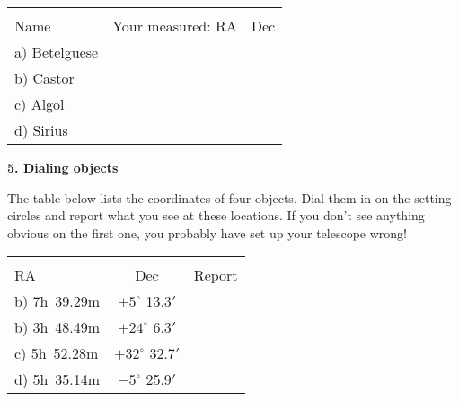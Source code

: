 \begin{center}
\begin{tabular}{lcc} \hline \\ [-6pt]
\hspace{1cm}Name\hspace{1cm} &  \hspace{1cm} Your measured:  RA \hspace{1cm} & Dec \\ [6pt]
\hline
a) Betelguese  & &     \\ \hline
b) Castor  & &  \\ \hline
c) Algol  & &    \\ \hline
d) Sirius  & &   \\ \hline
  \end{tabular}
\end{center}

\bigskip\noindent
{\bf 5. Dialing objects}

\bigskip\noindent The table below lists the coordinates of four
objects. Dial them in on the setting circles and report what you see
at these locations. If you don't see anything obvious on the first
one, you probably have set up your telescope wrong!

\begin{center}
\begin{tabular}{lcc} \hline \\ [-6pt]
 \hspace{1.5cm}  RA \hspace{1cm} & Dec \hspace{1cm}& \hspace{3cm}Report\hspace{3cm} \\ [6pt]
\hline
b) 7h~39.29m  & $+5^\circ$ 13.3$'$ &     \\ \hline %
b) 3h~48.49m  & $+24^\circ$ 6.3$'$ &     \\ \hline %
c) 5h~52.28m  & $+32^\circ$ 32.7$'$ &  \\ \hline %
d) 5h~35.14m   & $-5^\circ$ 25.9$'$ &    \\ \hline %
  \end{tabular}
\end{center}
